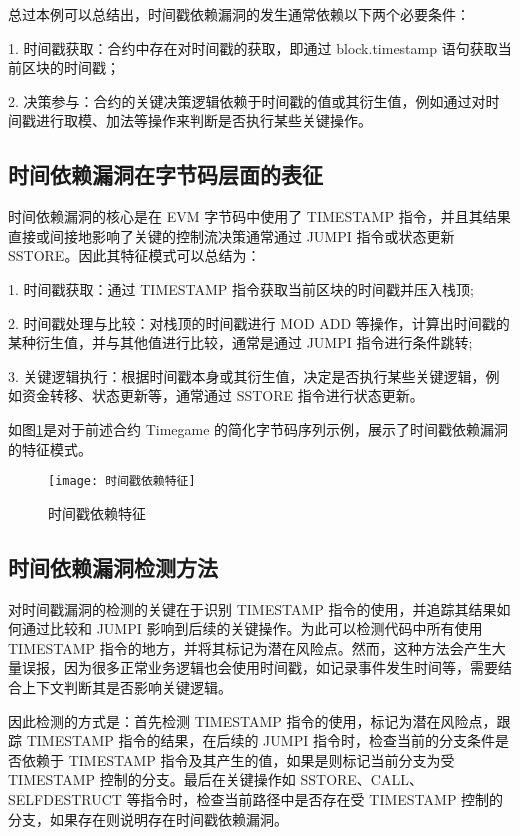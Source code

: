 \documentclass[print, master, vlined, timesmath]{DissertUESTC}
\begin{document}
总过本例可以总结出，时间戳依赖漏洞的发生通常依赖以下两个必要条件：

1. 时间戳获取：合约中存在对时间戳的获取，即通过 block.timestamp 语句获取当前区块的时间戳；

2. 决策参与：合约的关键决策逻辑依赖于时间戳的值或其衍生值，例如通过对时间戳进行取模、加法等操作来判断是否执行某些关键操作。

\subsection{时间依赖漏洞在字节码层面的表征}


时间依赖漏洞的核心是在 EVM 字节码中使用了 TIMESTAMP 指令，并且其结果直接或间接地影响了关键的控制流决策通常通过 JUMPI 指令或状态更新 SSTORE。因此其特征模式可以总结为：

1. 时间戳获取：通过 TIMESTAMP 指令获取当前区块的时间戳并压入栈顶;

2. 时间戳处理与比较：对栈顶的时间戳进行 MOD ADD 等操作，计算出时间戳的某种衍生值，并与其他值进行比较，通常是通过 JUMPI 指令进行条件跳转;

3. 关键逻辑执行：根据时间戳本身或其衍生值，决定是否执行某些关键逻辑，例如资金转移、状态更新等，通常通过 SSTORE 指令进行状态更新。

如图\ref{fig:时间戳依赖特征}是对于前述合约 Timegame 的简化字节码序列示例，展示了时间戳依赖漏洞的特征模式。



\begin{figure}[h]
    \centering
    \texttt{[image: 时间戳依赖特征]}
    \caption{时间戳依赖特征}
    \label{fig:时间戳依赖特征}
\end{figure}

\subsection{时间依赖漏洞检测方法}
对时间戳漏洞的检测的关键在于识别 TIMESTAMP 指令的使用，并追踪其结果如何通过比较和 JUMPI 影响到后续的关键操作。为此可以检测代码中所有使用 TIMESTAMP 指令的地方，并将其标记为潜在风险点。然而，这种方法会产生大量误报，因为很多正常业务逻辑也会使用时间戳，如记录事件发生时间等，需要结合上下文判断其是否影响关键逻辑。

因此检测的方式是：首先检测 TIMESTAMP 指令的使用，标记为潜在风险点，跟踪 TIMESTAMP 指令的结果，在后续的 JUMPI 指令时，检查当前的分支条件是否依赖于 TIMESTAMP 指令及其产生的值，如果是则标记当前分支为受 TIMESTAMP 控制的分支。最后在关键操作如 SSTORE、CALL、SELFDESTRUCT 等指令时，检查当前路径中是否存在受 TIMESTAMP 控制的分支，如果存在则说明存在时间戳依赖漏洞。
\end{document}
